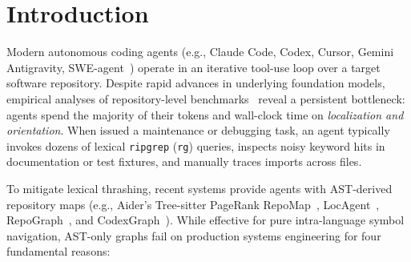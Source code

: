 \documentclass[11pt]{article}
\begin{document}
\section{Introduction}

Modern autonomous coding agents (e.g., Claude Code, Codex, Cursor, Gemini Antigravity, SWE-agent~\cite{yang2024sweagent}) operate in an iterative tool-use loop over a target software repository. Despite rapid advances in underlying foundation models, empirical analyses of repository-level benchmarks~\cite{jimenez2024swebench,xia2024agentless} reveal a persistent bottleneck: agents spend the majority of their tokens and wall-clock time on \emph{localization and orientation}. When issued a maintenance or debugging task, an agent typically invokes dozens of lexical \texttt{ripgrep} (\texttt{rg}) queries, inspects noisy keyword hits in documentation or test fixtures, and manually traces imports across files.

To mitigate lexical thrashing, recent systems provide agents with AST-derived repository maps (e.g., Aider's Tree-sitter PageRank RepoMap~\cite{aider2024repomap}, LocAgent~\cite{chen2025locagent}, RepoGraph~\cite{ouyang2024repograph}, and CodexGraph~\cite{liu2024codexgraph}). While effective for pure intra-language symbol navigation, AST-only graphs fail on production systems engineering for four fundamental reasons:
\end{document}
